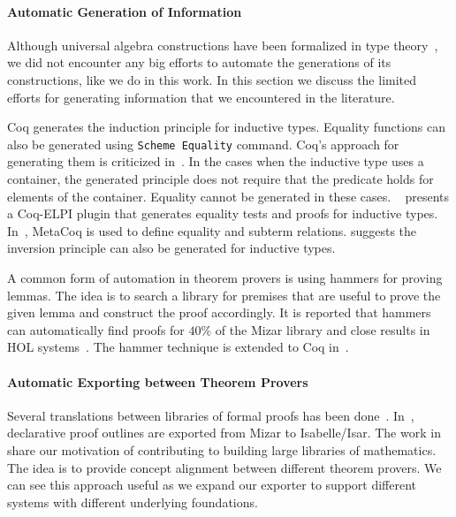 \paragraph{Automatic Generation of Information}
Although universal algebra constructions have been formalized in type theory~\cite{capretta99, Gunther2018Agda}, we did not encounter any big efforts to automate the generations of its constructions, like we do in this work. In this section we discuss the limited efforts for generating information that we encountered in the literature. 

Coq generates the induction principle for inductive types. Equality functions can also be generated using \verb|Scheme Equality| command. Coq's approach for generating them is criticized in~\cite{coqDeriveEquality2019}. In the cases when the inductive type uses a container, the generated principle does not require that the predicate holds for elements of the container. Equality cannot be generated in these cases. 
~\cite{coqDeriveEquality2019} presents a Coq-ELPI plugin that generates equality tests and proofs for inductive types. In~\cite{coqDeriveSubterm2020}, MetaCoq is used to define equality and subterm relations.
\cite{inversPrincp1996Coq} suggests the inversion principle can also be generated for inductive types.

A common form of automation in theorem provers is using hammers for proving lemmas. The idea is to search a library for premises that are useful to prove the given lemma and construct the proof accordingly. It is reported that hammers can automatically find proofs for $40\%$ of the Mizar library and close results in HOL systems~\cite{blanchette2016hammering}. The hammer technique is extended to Coq in~\cite{czajka2018hammer}. 

\paragraph{Automatic Exporting between Theorem Provers}
Several translations between libraries of formal proofs has been done~\cite{impsToOmdoc2018, mizarToIsabelle2018, iancu2013mizar}. In~\cite{kaliszyk2019DeclProofTerms}, declarative proof outlines are exported from Mizar to Isabelle/Isar. 
The work in~\cite{Muller2017alignment} share our motivation of contributing to building large libraries of mathematics. The idea is to provide concept alignment between different theorem provers. We can see this approach useful as we expand our exporter to support different systems with different underlying foundations.  

